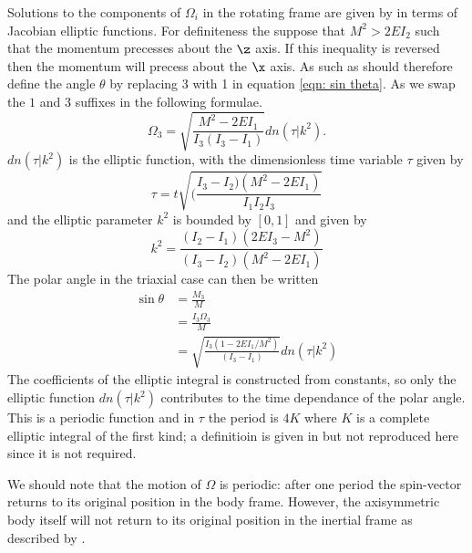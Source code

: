 \documentclass[/home/greg/Thesis/main/main.tex]{subfiles}
\begin{document}

Solutions to the components of $\Omega_{i}$ in the rotating frame are given 
by \citet{Landau1969} in terms of Jacobian elliptic functions. For definiteness
the suppose that $M^{2} > 2EI_{2}$ such that the momentum precesses about the
$\z$ axis. If this inequality is reversed then the momentum will precess
about the $\x$ axis. As such as should therefore define the angle $\theta$ 
by replacing 3 with 1 in equation \eqref{eqn: sin theta}. As we swap the 
$1$ and $3$ suffixes in the following formulae.
\begin{equation}
    \Omega_{3} = \sqrt{\frac{M^{2} - 2EI_{1}}{I_{3}\left(I_{3} - I_{1}\right)}} dn(\tau | k^{2}).
\end{equation}
$dn(\tau| k^{2})$ is the elliptic function, with the dimensionless time variable
$\tau$ given by 
\begin{equation}
    \tau = t\sqrt{(\frac{I_{3} - I_{2})(M^{2} - 2EI_{1})}{I_{1}I_{2}I_{3}}}
\end{equation}
and the elliptic parameter $k^{2}$ is bounded by $[0, 1]$ and given by 
\begin{equation}
    k^{2} = \frac{(I_{2} - I_{1})(2EI_{3} - M^{2})}{(I_{3}-I_{2})(M^{2} - 2EI_{1})}
    \label{eqn: k2}
\end{equation}
The polar angle in the triaxial case can then be written
\begin{align}
    \sin\theta & = \frac{M_{3}}{M} \\
               & = \frac{I_{3}\Omega_{3}}{M} \\
               & = \sqrt{\frac{I_{3}(1 - 2EI_{1}/M^{2})}{\left(I_{3} - I_{1}\right)}} dn(\tau | k^{2})
\end{align}
The coefficients of the elliptic integral is constructed from constants, so only
the elliptic function $dn(\tau| k^{2})$ contributes to the time dependance of the
polar angle. This
is a periodic function and in $\tau$ the period is $4K$ where $K$ is a complete
elliptic integral of the first kind; a definitioin is given in \citet{Landau1969}
but not reproduced here since it is not required.

We should note that the motion of $\Omega$ is periodic: after one period the 
spin-vector returns to its original position in the body frame. However, the 
axisymmetric body itself will not return to its original position in the
inertial frame as described by \citet{Landau1969}.
\end{document}
